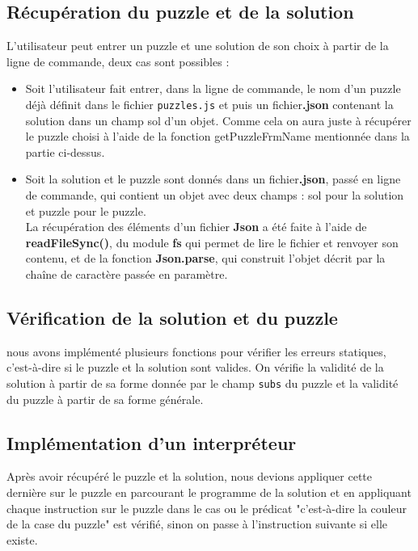 \documentclass[11pt]{article}
\begin{document}
\subsection{Récupération du puzzle et de la solution}
L'utilisateur peut entrer un puzzle et une solution de son choix à partir de la ligne de commande, deux cas sont possibles :
\begin{itemize}
    \item Soit l'utilisateur fait entrer, dans la ligne de commande, le nom d'un puzzle déjà définit dans le fichier \texttt{puzzles.js} et puis un fichier\textbf{.json} contenant la solution dans un champ sol d'un objet. Comme cela on aura juste à récupérer le puzzle choisi à l'aide de la fonction getPuzzleFrmName mentionnée dans la partie ci-dessus.
    \item Soit la solution et le puzzle sont donnés dans un fichier\textbf{.json}, passé en ligne de commande, qui contient un objet avec deux champs : sol pour la solution et puzzle pour le puzzle.\\ 
    La récupération des éléments d'un fichier \textbf{Json} a été faite à l'aide de \textbf{readFileSync()}, du module \textbf{fs} qui permet de lire le fichier et renvoyer son contenu, et de la fonction \textbf{Json.parse}, qui construit l'objet décrit par la chaîne de caractère passée en paramètre.
\end{itemize}
\subsection{Vérification de la solution et du puzzle }
nous avons implémenté plusieurs fonctions pour vérifier les erreurs statiques, c'est-à-dire si le puzzle et la solution sont valides. On vérifie la validité de la solution à partir de sa forme donnée par le champ \texttt{subs} du puzzle et la validité du puzzle à partir de sa forme générale.
\subsection{Implémentation d'un interpr\'eteur}
Après avoir récupéré le puzzle et la solution, nous devions appliquer cette dernière sur le puzzle en parcourant le programme de la solution et en appliquant chaque instruction sur le puzzle dans le cas ou le prédicat "c'est-à-dire la couleur de la case du puzzle" est vérifié, sinon on passe à l'instruction suivante si elle existe.
\end{document}

